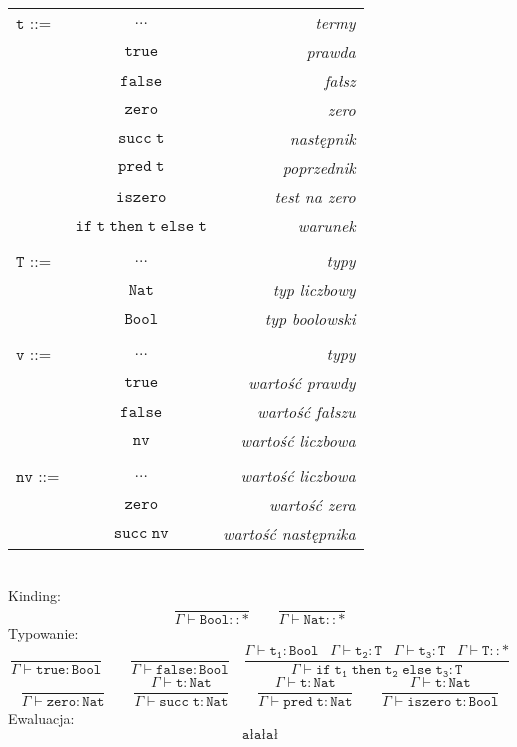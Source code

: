 \documentclass[11pt,leqno]{article}
\begin{document}
\begin{tabular}{| l c r |}
  \hline
  $\mathtt{t}$ ::= & $\dots$ & \textit{termy}  \\
   & $\mathtt{true}$ & \textit{prawda}  \\
   & $\mathtt{false}$ & \textit{fałsz} \\
   & $\mathtt{zero}$ & \textit{zero} \\
   & $\mathtt{succ\;t}$ & \textit{następnik}  \\
   & $\mathtt{pred\;t}$ & \textit{poprzednik} \\
   & $\mathtt{iszero}$ & \textit{test na zero} \\
   & $\mathtt{if\;t\;then\;t\;else\;t}$ & \textit{warunek} \\
   & & \\
  $\mathtt{T}$ ::= & $\dots$ & \textit{typy} \\
   & $\mathtt{Nat}$ & \textit{typ liczbowy} \\
   & $\mathtt{Bool}$ & \textit{typ boolowski} \\
   & & \\
  $\mathtt{v}$ ::= & $\dots$ & \textit{typy} \\
   & $\mathtt{true}$ & \textit{wartość prawdy} \\
   & $\mathtt{false}$ & \textit{wartość fałszu} \\
   & $\mathtt{nv}$ & \textit{wartość liczbowa} \\
   & & \\
  $\mathtt{nv}$ ::= & $\dots$ & \textit{wartość liczbowa} \\
   & $\mathtt{zero}$ & \textit{wartość zera} \\
   & $\mathtt{succ\;nv}$ & \textit{wartość następnika} \\
  \hline
\end{tabular} \\
Kinding:
 	\[\mathtt{ \frac{}{\Gamma \vdash Bool::\ast} \qquad \frac{}{\Gamma \vdash Nat::\ast}
		}
	\]
Typowanie:
 	\[\mathtt{ \frac{}{\Gamma \vdash true:Bool} \qquad \frac{}{\Gamma \vdash false:Bool} \quad \frac{\Gamma \vdash t_1:Bool \;\;\; \Gamma \vdash t_2:T \;\;\; \Gamma \vdash t_3:T \;\;\; \Gamma \vdash T::\ast}{\Gamma \vdash if\;t_1\;then\;t_2\;else\;t_3:T}
		}
	\]
 	\[\mathtt{ \frac{}{\Gamma \vdash zero:Nat} \qquad \frac{\Gamma \vdash t:Nat}{\Gamma \vdash succ\;t:Nat} \qquad \frac{\Gamma \vdash t:Nat}{\Gamma \vdash pred\;t:Nat} \qquad \frac{\Gamma \vdash t:Nat}{\Gamma \vdash iszero\;t:Bool}
		}
	\]
Ewaluacja:
 	\[\mathtt{ ał ał ał
		}
	\]
\end{document}

